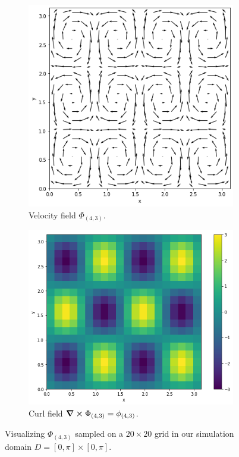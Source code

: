 \begin{figure}
  \centering
  \begin{subfigure}[t]{0.48\textwidth}
    \centering
    \includegraphics[height=\textwidth]{figures/eigenfluids/k_4_3_vel.png}
    \caption{Velocity field $\Phi_{(4,3)}$.}
  \end{subfigure}
  \begin{subfigure}[t]{0.48\textwidth}
    \centering
    \includegraphics[height=\textwidth]{figures/eigenfluids/k_4_3_curl_bar.png}
    \caption{Curl field $\curl{\Phi_{(4,3)}} = \phi_{(4,3)}$.}
  \end{subfigure}\par\medskip
  \caption{Visualizing $\Phi_{(4,3)}$ sampled on a $20 \times 20$ grid in
  our simulation domain $D = [0,\pi] \times [0,\pi]$.}
  \label{fig:phi-example}
\end{figure}

